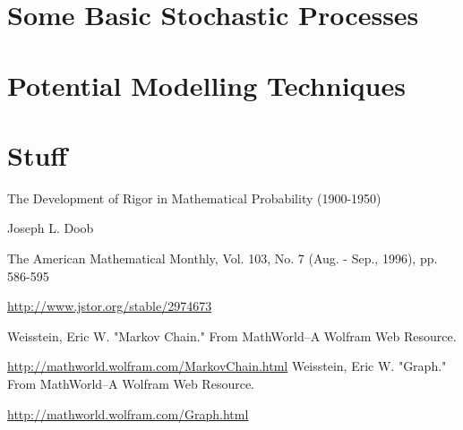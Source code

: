 \documentclass{report}
\begin{document}


\tableofcontents

\chapter{Some Basic Stochastic Processes}



\chapter{Potential Modelling Techniques}



\appendix
\chapter{Stuff}

\begin{thebibliography}{9}

	The Development of Rigor in Mathematical Probability (1900-1950)

	Joseph L. Doob

	The American Mathematical Monthly, Vol. 103, No. 7 (Aug. - Sep., 1996), pp. 586-595

	\url{http://www.jstor.org/stable/2974673}

	Weisstein, Eric W. "Markov Chain." From MathWorld--A Wolfram Web Resource. 

	\url{http://mathworld.wolfram.com/MarkovChain.html}
	Weisstein, Eric W. "Graph." From MathWorld--A Wolfram Web Resource. 
	
	\url{http://mathworld.wolfram.com/Graph.html}

\end{thebibliography}
\end{document}
